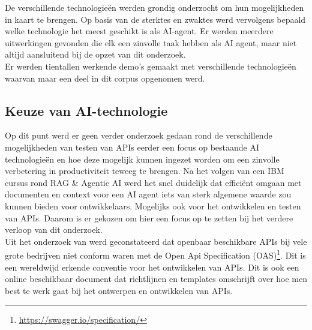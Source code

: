 De verschillende technologieën werden grondig onderzocht om hun mogelijkheden in kaart te brengen. Op basis van de sterktes en zwaktes werd vervolgens bepaald welke technologie het meest geschikt is als AI-agent. Er werden meerdere uitwerkingen gevonden die elk een zinvolle taak hebben als AI agent, maar niet altijd aansluitend bij de opzet van dit onderzoek. \\

Er werden tientallen werkende demo's gemaakt met verschillende technologieën waarvan maar een deel in dit corpus opgenomen werd. \\

\subsection{Keuze van AI-technologie}
\label{ssec:keuzevanaitechnologie}
Op dit punt werd er geen verder onderzoek gedaan rond de verschillende mogelijkheden van testen van APIs eerder een focus op bestaande AI technologieën en hoe deze mogelijk kunnen ingezet worden om een zinvolle verbetering in productiviteit teweeg te brengen. Na het volgen van een IBM cursus rond RAG \& Agentic AI werd het snel duidelijk dat efficiënt omgaan met documenten en context voor een AI agent iets van sterk algemene waarde zou kunnen bieden voor ontwikkelaars. Mogelijks ook voor het ontwikkelen en testen van APIs. Daarom is er gekozen om hier een focus op te zetten bij het verdere verloop van dit onderzoek. \\

Uit het onderzoek van \autocite{Golmohammadi2023} werd geconstateerd dat openbaar beschikbare APIs bij vele grote bedrijven niet conform waren met de Open Api Specification (OAS)\footnote{\href{https://swagger.io/specification/}{https://swagger.io/specification/}}. Dit is een wereldwijd erkende conventie voor het ontwikkelen van APIs. Dit is ook een online beschikbaar document dat richtlijnen en templates omschrijft over hoe men best te werk gaat bij het ontwerpen en ontwikkelen van APIs. \\

